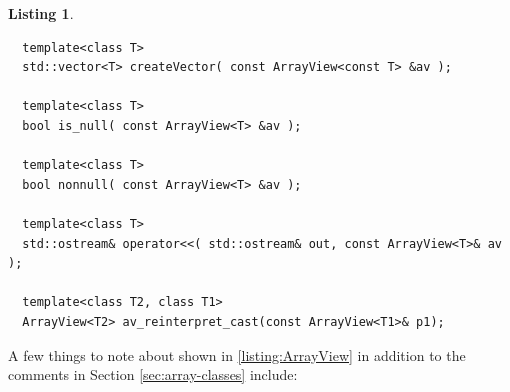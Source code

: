 \documentclass[pdf,ps2pdf,11pt]{SANDreport}
\newtheorem{listing}{Listing}
\begin{document}
\begin{listing}
{\begin{verbatim}
  template<class T>
  std::vector<T> createVector( const ArrayView<const T> &av );

  template<class T>
  bool is_null( const ArrayView<T> &av );

  template<class T>
  bool nonnull( const ArrayView<T> &av );

  template<class T>
  std::ostream& operator<<( std::ostream& out, const ArrayView<T>& av );

  template<class T2, class T1>
  ArrayView<T2> av_reinterpret_cast(const ArrayView<T1>& p1);

\end{verbatim}}
\end{listing}


A few things to note about {} shown in
{}\ref{listing:ArrayView} in addition to the comments in Section
{}\ref{sec:array-classes} include:
\end{document}
